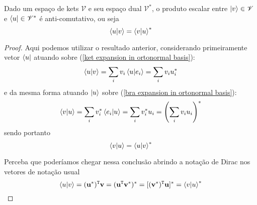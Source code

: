    \begin{properties}
        \label{proper: anti-commutation}
        Dado um espaço de kets $\mathscr{V}$ e seu espaço dual $\mathscr{V}^{\ast}$, o produto escalar entre $\ket{v}\in\mathscr{V}$ e $\bra{u}\in\mathscr{V}^{\ast}$ é anti-comutativo, ou seja 
            \begin{equation*}
                \braket{u}{v} = \braket{v}{u}^{\ast}
            \end{equation*}
    \end{properties}
    \begin{proof}
        Aqui podemos utilizar o resultado anterior, considerando primeiramente vetor $\bra{u}$ atuando sobre (\ref{ket expansion in ortonormal basis}):
        \begin{equation*}
            \braket{u}{v} = \sum_{i} v_{i} \braket{u}{e_{i}} = \sum_{i} v_{i} u_{i}^{\ast}
        \end{equation*}
        e da mesma forma atuando $\ket{u}$ sobre (\ref{bra expansion in ortonormal basis}):
        \begin{equation*}
            \braket{v}{u} = \sum_{i} v_{i}^{\ast} \braket{e_{i}}{u} = \sum_{i} v_{i}^{\ast} u_{i} = \left(\sum_{i} v_{i} u_{i}\right)^{\ast}
        \end{equation*}
        sendo portanto
        \begin{equation*}
            \braket{v}{u} = \braket{u}{v}^{\ast}
        \end{equation*}

        Perceba que poderíamos chegar nessa conclusão abrindo a notação de Dirac nos vetores de notação usual
        \begin{equation*}
            \braket{u}{v} = (\vb{u}^{\ast})^\mathtt{T}\vb{v} = (\vb{u}^{\mathtt{T}} \vb{v}^{\ast})^{\ast} = [(\vb{v}^{\ast})^{\mathtt{T}}\vb{u}]^{\ast} = \braket{v}{u}^{\ast}
        \end{equation*}
    \end{proof}

